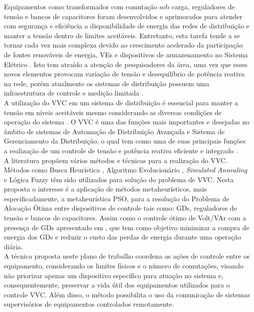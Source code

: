 \documentclass[]{IEEEphot}
\begin{document}
Equipamentos como transformador com comutação sob carga, reguladores de tensão e bancos de capacitores foram desenvolvidos e aprimorados para atender com segurança e eficiência a disponibilidade de energia das redes de distribuição e manter a tensão dentro de limites aceitáveis. Entretanto, esta tarefa tende a se tornar cada vez mais complexa devido ao crescimento acelerado da participação de fontes renováveis de energia, VEs e dispositivos de armazenamento no Sistema Elétrico \cite{Mercer2016}. Isto tem atraído a atenção de pesquisadores da área, uma vez que esses novos elementos provocam variação de tensão e desequilíbrio de potência reativa na rede, porém atualmente os sistemas de distribuição possuem uma infraestrutura de controle e medição limitada \cite{Mello2018}.\\
A utilização do VVC em um sistema de distribuição é essencial para manter a tensão em níveis aceitáveis mesmo considerando as diversas condições de operação do sistema \cite{Fassbinder2016}. O VVC é uma das funções mais importantes e desejadas no âmbito de sistemas de Automação de Distribuição Avançada e Sistema de Gerenciamento da Distribuição, o qual tem como uma de suas principais funções a realização de um controle de tensão e potência reativa eficiente e integrado \cite{Mercer2016}.\\
A literatura propõem vários métodos e técnicas para a realização do VVC. Métodos como Busca Heurística \cite{Deng2002}, Algoritmo Evolucionário \cite{Ulinuha2007}, \textit{Simulated Annealing} \cite{LiangeWang2003} e Lógica Fuzzy \cite{LiangeWang2003} têm sido utilizados para solução do problema de VVC. Nesta proposta o interesse é a aplicação de métodos metaheurísticos, mais especificadamente, a metaheurística PSO,  para a resolução do Problema de Alocação Ótima entre dispositivos de controle tais como: GDs, reguladores de tensão e bancos de capacitores. Assim como o controle ótimo de Volt/VAr com a presença de GDs apresentado em \cite{Auchariyamet2010}, que tem como objetivo minimizar a compra de energia dos GDs e reduzir o custo das perdas de energia durante uma operação diária.\\
A técnica proposta neste plano de trabalho coordena as ações de controle entre os equipamento, considerando os limites físicos e o número de comutações, visando não priorizar apenas um dispositivo específico para atuação no sistema e, consequentemente, preservar a vida útil dos equipamentos utilizados para o controle VVC. Além disso, o método possibilita o uso da comunicação de sistemas supervisórios de equipamentos controlados remotamente.
\end{document}
